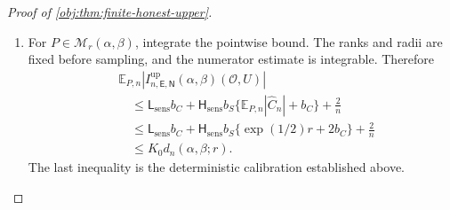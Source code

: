 \begin{proof}[Proof of \cref{obj:thm:finite-honest-upper}]
\begin{enumerate}
For the rectangle points with
\[
c_{\mathrm{rect}},c_{\mathrm{rect}}'\in[c_-,c_+],
\qquad
s_{\mathrm{rect}},s_{\mathrm{rect}}'\in\{s_-,s_+\},
\]
we have
\[
|c_{\mathrm{rect}}-c_{\mathrm{rect}}'|\le2b_C,
\qquad
|c_{\mathrm{rect}}'|\le|\widehat C_n|+b_C,
\qquad
|s_{\mathrm{rect}}-s_{\mathrm{rect}}'|\le2b_S.
\]
Inserting the cross quotient with numerator
\(c_{\mathrm{rect}}'\) and denominator \(s_{\mathrm{rect}}\) yields
\[
\begin{aligned}
\left|
\frac{c_{\mathrm{rect}}}{s_{\mathrm{rect}}}
-
\frac{c_{\mathrm{rect}}'}{s_{\mathrm{rect}}'}
\right|
&\le
\frac{|c_{\mathrm{rect}}-c_{\mathrm{rect}}'|}
     {s_{\mathrm{rect}}}
+
\frac{|c_{\mathrm{rect}}'|
      |s_{\mathrm{rect}}-s_{\mathrm{rect}}'|}
     {s_{\mathrm{rect}}s_{\mathrm{rect}}'}\\
&\le
\frac{2b_C}{s_0}
+
\frac{2b_S(|\widehat C_n|+b_C)}{s_0^2}.
\end{aligned}
\]
It follows that every pairing of an upper-numerator corner and a lower-numerator corner satisfies the same difference bound. Choosing the corners attaining the maximum \(R\) and minimum \(L\), including either choice in a tie, gives
\[
R-L
\le
\mathsf L_{\mathrm{sens}}b_C
+
\mathsf H_{\mathrm{sens}}b_S(|\widehat C_n|+b_C).
\]
By \cref{obj:lem:fixed-budget-realization}, the literal rational output has additional length at most \(2/n\). Hence, pointwise,
\[
\left|
I^{\mathrm{up}}_{n,\mathsf E,\mathsf N}(\alpha,\beta)(\mathcal O,U)
\right|
\le
\mathsf L_{\mathrm{sens}}b_C
+
\mathsf H_{\mathrm{sens}}b_S(|\widehat C_n|+b_C)
+\frac2n.
\]

\item For \(P\in\mathcal M_r(\alpha,\beta)\), integrate the pointwise bound. The ranks and radii are fixed before sampling, and the numerator estimate is integrable. Therefore
\[
\begin{aligned}
&\mathbb E_{P,n}
\left|
I^{\mathrm{up}}_{n,\mathsf E,\mathsf N}(\alpha,\beta)(\mathcal O,U)
\right|\\
&\quad\le
\mathsf L_{\mathrm{sens}}b_C
+
\mathsf H_{\mathrm{sens}}b_S
 \{\mathbb E_{P,n}|\widehat C_n|+b_C\}
+\frac2n\\
&\quad\le
\mathsf L_{\mathrm{sens}}b_C
+
\mathsf H_{\mathrm{sens}}b_S
 \{\exp(1/2)r+2b_C\}
+\frac2n\\
&\quad\le K_0d_n(\alpha,\beta;r).
\end{aligned}
\]
The last inequality is the deterministic calibration established above.


\end{enumerate}
\end{proof}
